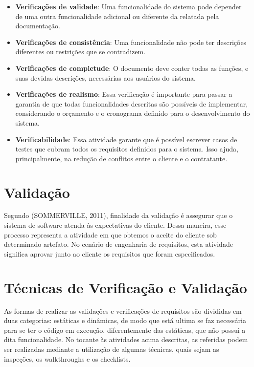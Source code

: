\documentclass[runningheads]{llncs}
\begin{document}
\begin{itemize}
    \item \textbf{Verificações de validade}: Uma funcionalidade do sistema pode depender de uma outra funcionalidade adicional ou diferente da relatada pela documentação.
    \item \textbf{Verificações de consistência}: Uma funcionalidade não pode ter descrições diferentes ou restrições que se contradizem.
    \item\textbf{Verificações de completude}: O documento deve conter todas as funções, e suas devidas descrições, necessárias aos usuários do sistema.
    \item \textbf{Verificações de realismo}: Essa verificação é importante para passar a garantia de que todas funcionalidades descritas são possíveis de implementar, considerando o orçamento e o cronograma definido para o desenvolvimento do sistema.
    \item \textbf{Verificabilidade}: Essa atividade garante que é possível escrever casos de testes que cubram todos os requisitos definidos para o sistema. Isso ajuda, principalmente, na redução de conflitos entre o cliente e o contratante.
\end{itemize}

\section{Validação}
Segundo (SOMMERVILLE, 2011)\cite{ref_book2}, finalidade da validação é assegurar que o sistema de software atenda às expectativas do cliente. Dessa maneira, esse processo representa a atividade em que obtemos o aceite do cliente sob determinado artefato. No cenário de engenharia de requisitos, esta atividade significa aprovar junto ao cliente os requisitos que foram especificados.

\section{Técnicas de Verificação e Validação}
As formas de realizar as validações e verificações de requisitos são divididas em duas categorias: estáticas e dinâmicas, de modo que está ultima se faz necessária para se ter o código em execução, diferentemente das estáticas, que não possui a dita funcionalidade. No tocante às atividades acima descritas, as referidas podem ser realizadas mediante a utilização de algumas técnicas, quais sejam as inspeções, os walkthroughs e os checklists.
\end{document}
